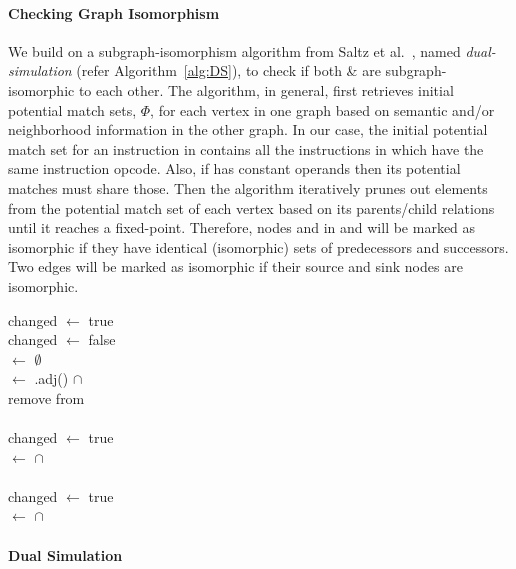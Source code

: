 \paragraph{Checking Graph Isomorphism}
%
We build on a subgraph-isomorphism algorithm from Saltz 
et al.~\cite{Saltz2014}, named 
\emph{dual-simulation} (refer Algorithm~\ref{alg:DS}),  to check if both \GN \& \GNP are 
subgraph-isomorphic to each other. The algorithm, in general, first 
retrieves initial potential match sets, $\Phi$,  for each vertex in one 
graph based on semantic and/or neighborhood information in the other graph.
In our case, the initial potential match set for an instruction 
\IN in \GN contains all the instructions in \GNP which have the same 
instruction opcode. Also, if \IN has constant operands then its potential 
matches must share 
those.  
Then the algorithm iteratively prunes out elements from the 
potential match 
set of each vertex based on its parents/child relations until it reaches a 
fixed-point.
%
Therefore, nodes  and \Ap in \GN and \GNP will be marked as isomorphic if
they have identical (isomorphic) sets of predecessors and successors.
%
Two edges will be marked as isomorphic if their source and sink nodes are isomorphic.

\begin{algorithm}
    \BlankLine

    changed $\gets$ true \\
     { 
       changed $\gets$ false \\
       \For{\un $\gets$ \GN } {
            {
               \potpup $\gets$ $\emptyset$ \\
               \For{ \vn $\gets$ \potu } {
                   \potvup $\gets$ \GN.adj(\vn) $\cap$ \potup \\
                   \If{\potvup = $\empty$} {
                       remove \vn from \potu \\
                       \If{\potu = $\emptyset$} {
                           \KwRet{$\emptyset$} \\
                       }
                       changed $\gets$ true \\
                   }
                   \potpup $\gets$ \potpup $\cap$ \potvup \\
               }
               \If{ \potpup = $\emptyset$} {
                   \KwRet{$\emptyset$} \\
               }
                {
                   changed $\gets$ true \\
               }
               \potup $\gets$ \potup $\cap$ \potpup \\
           }
       }
   }
   \KwRet{$\emptyset$} \\
    \caption{\textbf{Dual Simulation}}\label{alg:DS}
\end{algorithm}

